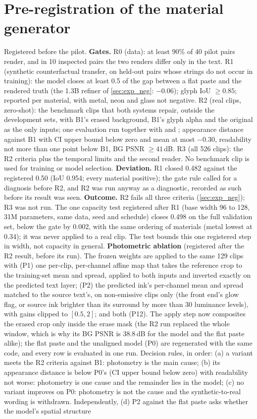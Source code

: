 \section{Pre-registration of the material generator}
\label{sec:supp_prereg_matgen}
Registered before the pilot. \textbf{Gates.} R0 (data): at least 90\% of 40 pilot pairs render, and in 10 inspected pairs the two renders differ only in the text. R1 (synthetic counterfactual transfer, on held-out pairs whose strings do not occur in training): the model closes at least 0.5 of the gap between a flat paste and the rendered truth (the 1.3B refiner of \cref{sec:exp_neg}: $-0.06$); glyph IoU $\geq 0.85$; reported per material, with metal, neon and glass not negative. R2 (real clips, zero-shot): the benchmark clips that both systems repair, outside the development sets, with B1's erased background, B1's glyph alpha and the original as the only inputs; one evaluation run together with \method and \steer; appearance distance against B1 with CI upper bound below zero and mean at most $-0.30$, readability not more than one point below B1, BG PSNR $\geq 41$\,dB. R3 (all 526 clips): the R2 criteria plus the temporal limits and the second reader. No benchmark clip is used for training or model selection. \textbf{Deviation.} R1 closed 0.482 against the registered 0.50 (IoU 0.954; every material positive); the gate rule called for a diagnosis before R2, and R2 was run anyway as a diagnostic, recorded as such before its result was seen. \textbf{Outcome.} R2 fails all three criteria (\cref{sec:exp_neg}); R3 was not run. The one capacity test registered after R1 (base width 96 to 128, 31M parameters, same data, seed and schedule) closes 0.498 on the full validation set, below the gate by 0.002, with the same ordering of materials (metal lowest at 0.34); it was never applied to a real clip. The test bounds this one registered step in width, not capacity in general. \textbf{Photometric ablation} (registered after the R2 result, before its run). The frozen weights are applied to the same 129 clips with (P1) one per-clip, per-channel affine map that takes the reference crop to the training-set mean and spread, applied to both inputs and inverted exactly on the predicted text layer; (P2) the predicted ink's per-channel mean and spread matched to the source text's, on non-emissive clips only (the front end's glow flag, or source ink brighter than its surround by more than 30 luminance levels), with gains clipped to $[0.5, 2]$; and both (P12). The apply step now composites the erased crop only inside the erase mask (the R2 run replaced the whole window, which is why its BG PSNR is 38.8\,dB for the model and the flat paste alike); the flat paste and the unaligned model (P0) are regenerated with the same code, and every row is evaluated in one run. Decision rules, in order: (a) a variant meets the R2 criteria against B1: photometry is the main cause; (b) its appearance distance is below P0's (CI upper bound below zero) with readability not worse: photometry is one cause and the remainder lies in the model; (c) no variant improves on P0: photometry is not the cause and the synthetic-to-real wording is withdrawn. Independently, (d) P2 against the flat paste asks whether the model's spatial structure 